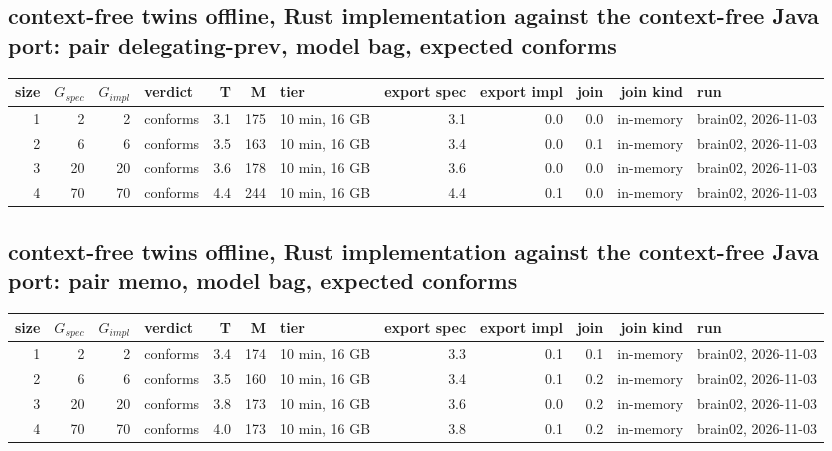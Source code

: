 \documentclass[10pt]{article}
\begin{document}
\subsection*{context-free twins offline, Rust implementation against the context-free Java port: pair \textsf{delegating-prev}, model bag, expected conforms}
\begin{longtable}{@{}rrrlrrlrrrrl@{}}
\toprule
size & $G_{\mathit{spec}}$ & $G_{\mathit{impl}}$ & verdict & T & M & tier & export spec & export impl & join & join kind & run \\
\midrule
\endhead
\color{red} 1 & 2 & 2 & conforms & 3.1 & 175 & 10 min, 16 GB & 3.1 & 0.0 & 0.0 & in-memory & brain02, 2026-11-03 \\
\color{red} 2 & 6 & 6 & conforms & 3.5 & 163 & 10 min, 16 GB & 3.4 & 0.0 & 0.1 & in-memory & brain02, 2026-11-03 \\
\color{red} 3 & 20 & 20 & conforms & 3.6 & 178 & 10 min, 16 GB & 3.6 & 0.0 & 0.0 & in-memory & brain02, 2026-11-03 \\
\color{red} 4 & 70 & 70 & conforms & 4.4 & 244 & 10 min, 16 GB & 4.4 & 0.1 & 0.0 & in-memory & brain02, 2026-11-03 \\
\bottomrule
\end{longtable}
\subsection*{context-free twins offline, Rust implementation against the context-free Java port: pair \textsf{memo}, model bag, expected conforms}
\begin{longtable}{@{}rrrlrrlrrrrl@{}}
\toprule
size & $G_{\mathit{spec}}$ & $G_{\mathit{impl}}$ & verdict & T & M & tier & export spec & export impl & join & join kind & run \\
\midrule
\endhead
\color{red} 1 & 2 & 2 & conforms & 3.4 & 174 & 10 min, 16 GB & 3.3 & 0.1 & 0.1 & in-memory & brain02, 2026-11-03 \\
\color{red} 2 & 6 & 6 & conforms & 3.5 & 160 & 10 min, 16 GB & 3.4 & 0.1 & 0.2 & in-memory & brain02, 2026-11-03 \\
\color{red} 3 & 20 & 20 & conforms & 3.8 & 173 & 10 min, 16 GB & 3.6 & 0.0 & 0.2 & in-memory & brain02, 2026-11-03 \\
\color{red} 4 & 70 & 70 & conforms & 4.0 & 173 & 10 min, 16 GB & 3.8 & 0.1 & 0.2 & in-memory & brain02, 2026-11-03 \\
\bottomrule
\end{longtable}
\end{document}
